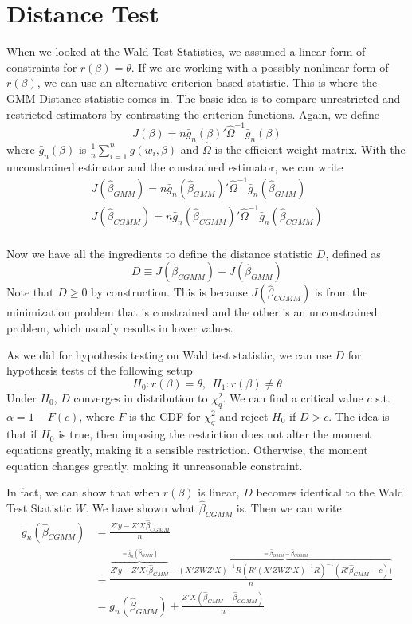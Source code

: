 \section{Distance Test}
When we looked at the Wald Test Statistics, we assumed a linear form of constraints for $r(\beta)=\theta$. If we are working with a possibly nonlinear form of $r(\beta)$, we can use an alternative criterion-based statistic. This is where the GMM Distance statistic comes in. The basic idea is to compare unrestricted and restricted estimators by contrasting the criterion functions. Again, we define
\[
J(\beta)=n\bar{g}_n(\beta)'\widehat{\Omega}^{-1}\bar{g}_n(\beta)
\]
where $\bar{g}_n(\beta)$ is $\frac{1}{n}\sum_{i=1}^n g(w_i,\beta)$ and $\widehat{\Omega}$ is the efficient weight matrix. With the unconstrained estimator and the constrained estimator, we can write
\begin{gather*}
J(\hat{\beta}_{GMM})=n\bar{g}_n(\hat{\beta}_{GMM})'\widehat{\Omega}^{-1}\bar{g}_n(\hat{\beta}_{GMM})\\
J(\hat{\beta}_{CGMM})=n\bar{g}_n(\hat{\beta}_{CGMM})'\widehat{\Omega}^{-1}\bar{g}_n(\hat{\beta}_{CGMM})\\
\end{gather*}\par
Now we have all the ingredients to define the distance statistic $D$, defined as
\[
D\equiv J(\hat{\beta}_{CGMM})-J(\hat{\beta}_{GMM})
\]
Note that $D\geq0$ by construction. This is because $J(\hat{\beta}_{CGMM})$ is from the minimization problem that is constrained and the other is an unconstrained problem, which usually results in lower values.\par
As we did for hypothesis testing on Wald test statistic, we can use $D$ for hypothesis tests of the following setup
\[
H_0: r(\beta)=\theta, \ \ H_1: r(\beta)\neq \theta
\]
Under $H_0$, $D$ converges in distribution to $\chi_q^2$. We can find a critical value $c$ s.t. $\alpha = 1-F(c)$, where $F$ is the CDF for $\chi_q^2$ and reject $H_0$ if $D>c$. The idea is that if $H_0$ is true, then imposing the restriction does not alter the moment equations greatly, making it a sensible restriction. Otherwise, the moment equation changes greatly, making it unreasonable constraint. \par
\par
 In fact, we can show that when $r(\beta)$ is linear, $D$ becomes identical to the Wald Test Statistic $W$. We have shown what $\hat{\beta}_{CGMM}$ is. Then we can write 
 \[
 \begin{aligned}
 \bar{g}_n(\hat{\beta}_{CGMM})&=\frac{Z'y-Z'X\hat{\beta}_{CGMM}}{n}\\
 & =\frac{\overbrace{Z'y-Z'X(\hat{\beta}_{GMM}}^{=\bar{g}_n(\hat{\beta}_{GMM})}-\overbrace{(X'ZWZ'X)^{-1}R(R'(X'ZWZ'X)^{-1}R)^{-1}(R'\hat{\beta}_{GMM}-c))}^{=\hat{\beta}_{GMM}-\hat{\beta}_{CGMM}}}{n}\\
 &=\bar{g}_n(\hat{\beta}_{GMM})+\frac{Z'X(\hat{\beta}_{GMM}-\hat{\beta}_{
 CGMM})}{n}\\
 \end{aligned}
 \]

